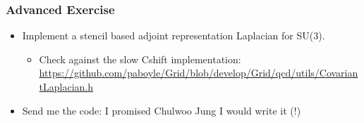 \documentclass[pdf,ps,8pt]{beamer}
\newcommand{\link}[1]{\href{#1}{ {\color{blue} #1} }}
\begin{document}
\begin{frame}[fragile]\small\frametitle{ Advanced Exercise}

\begin{itemize}
\item Implement a stencil based adjoint representation Laplacian for SU(3).
\begin{itemize}
\item Check against the slow Cshift implementation: \link{https://github.com/paboyle/Grid/blob/develop/Grid/qcd/utils/CovariantLaplacian.h}
\end{itemize}
\item Send me the code: I promised Chulwoo Jung I would write it (!)
\end{itemize}

\end{frame}
\end{document}
